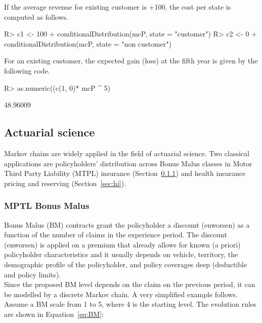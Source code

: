 \documentclass[nojss]{jss}
\begin{document}
If the average revenue for existing customer is +100, the cost per state is computed as follows.

\begin{Schunk}
\begin{Sinput}
R> c1 <- 100 + conditionalDistribution(mcP, state = "customer") %
R> c2 <- 0 + conditionalDistribution(mcP, state = "non customer") %
\end{Sinput}
\end{Schunk}

For an existing customer, the expected gain (loss) at the fifth year is given by the following code.

\begin{Schunk}
\begin{Sinput}
R> as.numeric((c(1, 0)* mcP ^ 5) %
\end{Sinput}
\begin{Soutput}
[1] 48.96009
\end{Soutput}
\end{Schunk}
\subsection{Actuarial science}\label{app:act}

Markov chains are widely applied in the field of actuarial science. Two
classical applications are policyholders' distribution across Bonus Malus
classes in Motor Third Party Liability (MTPL) insurance (Section~\ref{sec:bm}) and health insurance pricing and reserving 
(Section~\ref{sec:hi}).


\subsubsection{MPTL Bonus Malus}\label{sec:bm}

Bonus Malus (BM) contracts grant the policyholder a discount (enworsen) as a
function of the number of claims in the experience period. The discount (enworsen) is applied on a premium that 
already allows for known (a priori) policyholder characteristics \citep{denuit2007actuarial}
and it usually depends on vehicle, territory, the demographic profile of the policyholder, and policy coverages deep (deductible and policy limits).\\
Since the proposed BM level depends on the claim on the previous period, it can
be modelled by a discrete Markov chain. A very simplified example follows.
Assume a BM scale from 1 to 5, where 4 is the starting level. The evolution rules are shown in Equation~\ref{eq:BM}:
\end{document}
